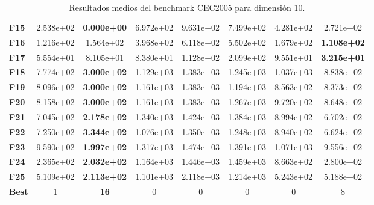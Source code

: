 \begin{table}
{\begin{tabular}{lccccccc}
		\midrule
		\textbf{F15}  &  2.538e+02 &   \textbf{0.000e+00} &  6.972e+02 &  9.631e+02 &  7.499e+02 &  4.281e+02 &  2.721e+02 \\
		\textbf{F16}  &  1.216e+02 &   1.564e+02 &  3.968e+02 &  6.118e+02 &  5.502e+02 &  1.679e+02 &  \textbf{1.108e+02} \\
		\textbf{F17}  &  5.554e+01 &   8.105e+01 &  8.380e+01 &  1.128e+02 &  2.099e+02 &  9.551e+01 &  \textbf{3.215e+01} \\
		\textbf{F18}  &  7.774e+02 &   \textbf{3.000e+02} &  1.129e+03 &  1.383e+03 &  1.245e+03 &  1.037e+03 &  8.838e+02 \\
		\textbf{F19}  &  8.096e+02 &   \textbf{3.000e+02} &  1.161e+03 &  1.383e+03 &  1.194e+03 &  8.563e+02 &  8.373e+02 \\
		\textbf{F20}  &  8.158e+02 &   \textbf{3.000e+02} &  1.161e+03 &  1.383e+03 &  1.267e+03 &  9.720e+02 &  8.648e+02 \\
		\textbf{F21}  &  7.045e+02 &   \textbf{2.178e+02} &  1.340e+03 &  1.424e+03 &  1.384e+03 &  8.994e+02 &  6.702e+02 \\
		\textbf{F22}  &  7.250e+02 &   \textbf{3.344e+02} &  1.076e+03 &  1.350e+03 &  1.248e+03 &  8.940e+02 &  6.624e+02 \\
		\textbf{F23}  &  9.590e+02 &   \textbf{1.997e+02} &  1.317e+03 &  1.474e+03 &  1.391e+03 &  1.071e+03 &  9.556e+02 \\
		\textbf{F24}  &  2.365e+02 &   \textbf{2.032e+02} &  1.164e+03 &  1.446e+03 &  1.459e+03 &  8.663e+02 &  2.800e+02 \\
		\textbf{F25}  &  5.109e+02 &   \textbf{2.113e+02} &  1.101e+03 &  2.118e+03 &  1.214e+03 &  5.243e+02 &  5.188e+02 \\
		\midrule
		\textbf{Best} &          1 &          \textbf{16} &          0 &          0 &          0 &          0 &          8 \\
		\bottomrule
	\end{tabular}}
	\caption{Resultados medios del benchmark CEC2005 para dimensión 10.}
\end{table}

